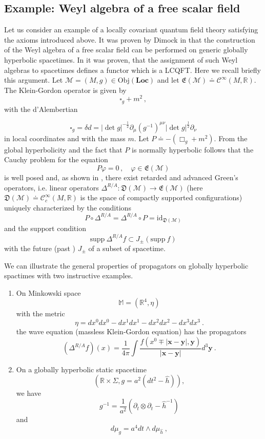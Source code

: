 \documentclass[11pt]{article}
\newcommand{\E}{\mathfrak{E}}
\newcommand{\D}{\mathfrak{D}}
\newcommand{\Mcal}{\mathcal{M}}
\newcommand{\Ci}{\mathcal{C}^\infty} %
\newcommand{\obj}{\mathrm{Obj}}
\newcommand{\Loc}{\mathrm{\mathbf{Loc}}}       %
\newcommand{\RR}{\mathbb{R}}           %
\newcommand{\ph}{\varphi}
\newcommand{\1}{\mathds{1}}                         %
\begin{document}
\subsection{Example: Weyl algebra of a free scalar field}\label{freescalar}
Let us consider an example of a locally covariant quantum field theory satisfying the axioms introduced above. It was proven by Dimock in \cite{Dim} that the construction of the Weyl algebra of a free scalar field can be performed on generic globally hyperbolic spacetimes. In \cite{BFV} it was proven, that the assignment of such Weyl algebras to spacetimes defines a functor which is a LCQFT. Here we recall briefly this argument. Let $\Mcal=(M,g)\in\obj(\Loc)$ and let $\E(\Mcal)\doteq\Ci(M,\RR)$. The Klein-Gordon operator  is given by
\[
\square_g+m^2\,,
\]
with the d'Alembertian
{\[\square_g=\delta d=|\det{g}|^{-\frac12}\partial_{\mu}(g^{-1})^{\mu\nu}|\det{g}|^{\frac12}\partial_{\nu}\]
in local coordinates and with the mass $m$.  Let $P\doteq -(\Box_g+m^2)$. From the global hyperbolicity and the fact that $P$ is normally hyperbolic follows that the Cauchy problem for the equation 
\[
P\ph=0\,,\quad \ph\in\mathfrak{E}(\mathcal{M})
\]
is well posed and, as shown in \cite{Baer}, there exist retarded and advanced Green's operators, i.e. linear operators  $\Delta^{R/A}:\D(\Mcal)\rightarrow\E(\Mcal)$ (here $\D(\Mcal)\doteq\Ci_c(M,\RR)$ is the space of compactly supported configurations)  uniquely characterized by the conditions
\[P\circ \Delta^{R/A}=\Delta^{R/A}\circ P=\mathrm{id}_{\mathfrak{D}(\mathcal{M})}\]
and the support condition
\[\mathrm{supp} \ \Delta^{R/A}f\subset J_{\pm}(\mathrm{supp} \  f)\]
with the future (past ) $J_{\pm}$ of a subset of spacetime. 
\begin{exa}
We can illustrate the general properties of propagators on globally hyperbolic spactimes with two instructive examples.
\begin{enumerate}
\item
On Minkowski space
\[\mathbb{M}=(\RR^4,\eta)\]
with the metric
\[\eta=dx^0dx^0-dx^1dx^1-dx^2dx^2-dx^3dx^3 \ .\]
the wave equation (massless Klein-Gordon equation) has the propagators
\[(\Delta^{R/A}f)(x)=\frac{1}{4\pi}\int \frac{f(x^0\mp |\mathbf x-\mathbf y|,\mathbf y)}{|\mathbf x-\mathbf y|}d^3\mathbf y \ .\]
\item
On a globally hyperbolic static spacetime 
\[(\RR\times\Sigma, g=a^2(dt^2-\hat{h})),\] 
we have 
\[g^{-1}=\frac{1}{a^2}(\partial_t\otimes\partial_t-\hat{h}^{-1})\] 
and
\[d\mu_g=a^4dt\wedge d\mu_{\hat{h}}\ ,\]

\end{enumerate}
\end{exa}}
\end{document}
